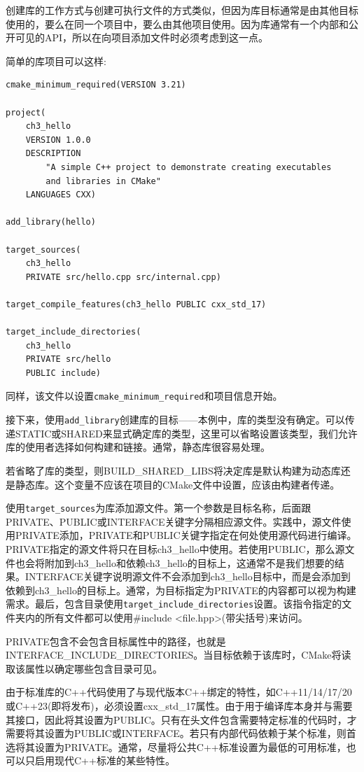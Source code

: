 
创建库的工作方式与创建可执行文件的方式类似，但因为库目标通常是由其他目标使用的，要么在同一个项目中，要么由其他项目使用。因为库通常有一个内部和公开可见的API，所以在向项目添加文件时必须考虑到这一点。

简单的库项目可以这样:

\begin{lstlisting}[style=styleCMake]
cmake_minimum_required(VERSION 3.21)

project(
	ch3_hello
	VERSION 1.0.0
	DESCRIPTION
		"A simple C++ project to demonstrate creating executables
		and libraries in CMake"
	LANGUAGES CXX)
	
add_library(hello)

target_sources(
	ch3_hello
	PRIVATE src/hello.cpp src/internal.cpp)
	
target_compile_features(ch3_hello PUBLIC cxx_std_17)

target_include_directories(
	ch3_hello
	PRIVATE src/hello
	PUBLIC include)
\end{lstlisting}

同样，该文件以设置\texttt{cmake\_minimum\_required}和项目信息开始。

接下来，使用\texttt{add\_library}创建库的目标——本例中，库的类型没有确定。可以传递STATIC或SHARED来显式确定库的类型，这里可以省略设置该类型，我们允许库的使用者选择如何构建和链接。通常，静态库很容易处理。

若省略了库的类型，则BUILD\_SHARED\_LIBS将决定库是默认构建为动态库还是静态库。这个变量不应该在项目的CMake文件中设置，应该由构建者传递。

使用\texttt{target\_sources}为库添加源文件。第一个参数是目标名称，后面跟PRIVATE、PUBLIC或INTERFACE关键字分隔相应源文件。实践中，源文件使用PRIVATE添加，PRIVATE和PUBLIC关键字指定在何处使用源代码进行编译。PRIVATE指定的源文件将只在目标ch3\_hello中使用。若使用PUBLIC，那么源文件也会将附加到ch3\_hello和依赖ch3\_hello的目标上，这通常不是我们想要的结果。INTERFACE关键字说明源文件不会添加到ch3\_hello目标中，而是会添加到依赖到ch3\_hello的目标上。通常，为目标指定为PRIVATE的内容都可以视为构建需求。最后，包含目录使用\texttt{target\_include\_directories}设置。该指令指定的文件夹内的所有文件都可以使用\#include <file.hpp>(带尖括号)来访问。

PRIVATE包含不会包含目标属性中的路径，也就是INTERFACE\_INCLUDE\_DIRECTORIES。当目标依赖于该库时，CMake将读取该属性以确定哪些包含目录可见。

由于标准库的C++代码使用了与现代版本C++绑定的特性，如C++11/14/17/20或C++23(即将发布)，必须设置cxx\_std\_17属性。由于用于编译库本身并与需要其接口，因此将其设置为PUBLIC。只有在头文件包含需要特定标准的代码时，才需要将其设置为PUBLIC或INTERFACE。若只有内部代码依赖于某个标准，则首选将其设置为PRIVATE。通常，尽量将公共C++标准设置为最低的可用标准，也可以只启用现代C++标准的某些特性。

